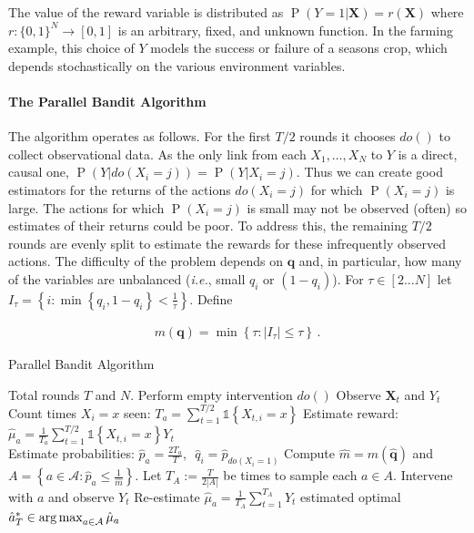 \documentclass[11pt,a4paper,twoside]{report}
\newcommand{\actions}{\mathcal{A}}
\newcommand{\ie}{\textit{i.e.}}
\newcommand{\set}[1]{\left\{#1\right\}}
\newcommand{\ind}[1]{\mathds{1}\!\!\set{#1}}
\newcommand{\argmax}{\operatornamewithlimits{arg\,max}}
\newcommand{\eq}[1]{\begin{align*}#1\end{align*}}
\renewcommand{\P}[1]{\operatorname{P}\left(#1\right)}
\renewcommand{\vec}[1]{\boldsymbol{#1}}
\theoremstyle{plain}
\theoremstyle{definition}
\begin{document}
The value of the reward variable is distributed as $\P{Y = 1|\vec{X}} = r(\vec{X})$ where 
$r : \{0,1\}^N \to [0,1]$ is an arbitrary, fixed, and unknown function. 
In the farming example, this choice of $Y$ models the success or failure of a seasons crop, 
which depends stochastically on the various environment variables.


\paragraph{The Parallel Bandit Algorithm}
The algorithm operates as follows. For the first $T/2$ rounds it chooses $do()$ to collect observational data. As the only link from each $X_1,\ldots,X_N$ to $Y$ is a direct, causal one, $\P{Y|do(X_i=j)}=\P{Y|X_i=j}$. Thus we can create good estimators for the returns of the actions $do(X_i = j)$ for which $\P{X_i = j}$ is large. The actions for which $\P{X_i = j}$ is small may not be observed (often) so  estimates of their returns could be poor. To address this, the remaining $T/2$ rounds are evenly split to estimate the rewards for these infrequently observed actions. The difficulty of the problem depends on $\vec{q}$ and, in particular, how many of the variables are unbalanced (\ie, small $q_i$ or $(1-q_i)$). For $\tau \in [2...N]$ let $I_\tau = \set{ i : \min\set{q_i, 1-q_i} < \frac{1}{\tau}}$. Define

\eq{
\label{eq:m-simple}
m(\vec{q}) = \min \set{ \tau : |I_{\tau}| \leq \tau}\,.
}


\begin{algorithm}[H]
\caption{Parallel Bandit Algorithm}\label{alg:simple}
\begin{algorithmic}[1]
 Total rounds $T$ and $N$.
\STATE Perform empty intervention $do()$
\STATE Observe $\vec{X}_t$ and $Y_t$
\ENDFOR
\FOR{$a = do(X_i = x) \in \actions$}
\STATE Count times $X_i = x$ seen: $T_a = \sum_{t=1}^{T/2} \ind{X_{t,i} = x}$
\STATE Estimate reward: $\hat{\mu}_a = \frac{1}{T_a} \sum_{t=1}^{T/2} \ind{X_{t,i} = x} Y_t$ \\[0.2cm]
\STATE Estimate probabilities: $\hat{p}_a = \frac{2 T_a}{T}$,\,\, $\hat q_i = \hat p_{do(X_i = 1)}$
\ENDFOR
\STATE Compute $\hat{m} = m(\vec{\hat q})$ and $A = \set{a \in \actions \colon \hat{p}_a \leq \frac{1}{\hat m}}$.
\STATE Let $T_A := \frac{T}{2 |A|}$ be times to sample each $a\in A$.
\STATE Intervene with $a$ and observe $Y_t$
\ENDFOR
\STATE Re-estimate $\hat{\mu}_a = \frac{1}{T_A} \sum_{t=1}^{T_A} Y_t$
\ENDFOR
\RETURN estimated optimal $\hat{a}^*_T \in \argmax_{a\in\actions} \hat{\mu}_a$
\end{algorithmic}
\end{algorithm}
\end{document}
